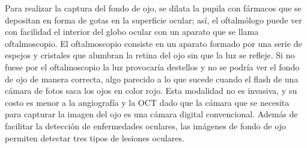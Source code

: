 Para realizar la captura del fondo de ojo, se dilata la pupila con f\'armacos que se depositan en forma de gotas en la superficie ocular; as\'i, el oftalm\'ologo puede ver con facilidad el interior del globo ocular con un aparato que se llama oftalmoscopio. El oftalmoscopio consiste en un aparato formado por una serie de espejos y cristales que alumbran la retina del ojo sin que la luz se refleje. Si no fuese por el oftalmoscopio la luz provocar\'ia destellos y no se podría ver el fondo de ojo de manera correcta, algo parecido a lo que sucede cuando el flash de una cámara de fotos saca los ojos en color rojo. Esta modalidad no es invasiva, y su costo es menor a la angiografía y la OCT dado que la c\'amara que se necesita para capturar la imagen del ojo es una c\'amara digital convencional.
Adem\'as de facilitar la detecci\'on de enfermedades oculares, las im\'agenes de fondo de ojo permiten detectar tres tipos de lesiones oculares. 


